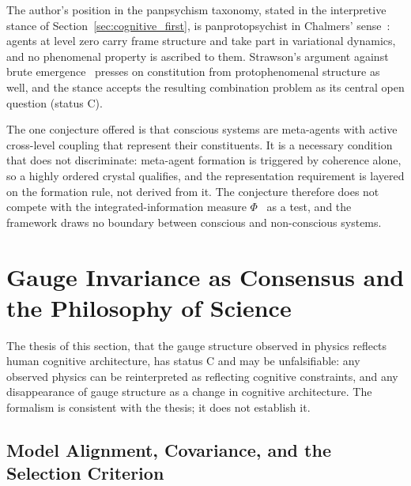The author's position in the panpsychism taxonomy, stated in the interpretive stance of Section~\ref{sec:cognitive_first}, is panprotopsychist in Chalmers' sense~\cite{Chalmers2013consciousness, Chalmers2016}: agents at level zero carry frame structure and take part in variational dynamics, and no phenomenal property is ascribed to them. Strawson's argument against brute emergence~\cite{Strawson2006} presses on constitution from protophenomenal structure as well, and the stance accepts the resulting combination problem as its central open question (status C).

The one conjecture offered is that conscious systems are meta-agents with active cross-level coupling that represent their constituents. It is a necessary condition that does not discriminate: meta-agent formation is triggered by coherence alone, so a highly ordered crystal qualifies, and the representation requirement is layered on the formation rule, not derived from it. The conjecture therefore does not compete with the integrated-information measure $\Phi$~\cite{Tononi2004, Tononi2016} as a test, and the framework draws no boundary between conscious and non-conscious systems.

\section{Gauge Invariance as Consensus and the Philosophy of Science}\label{sec:gauge_invariance_consensus}

The thesis of this section, that the gauge structure observed in physics reflects human cognitive architecture, has status C and may be unfalsifiable: any observed physics can be reinterpreted as reflecting cognitive constraints, and any disappearance of gauge structure as a change in cognitive architecture. The formalism is consistent with the thesis; it does not establish it.

\subsection{Model Alignment, Covariance, and the Selection Criterion}

